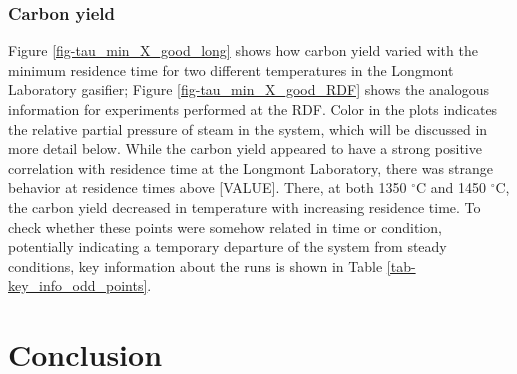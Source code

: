 \documentclass[11pt,twocolumn]{article}
\begin{document}
\subsubsection*{Carbon yield}
Figure \ref{fig-tau_min_X_good_long} shows how carbon yield varied with the minimum residence time for two different temperatures in the Longmont Laboratory gasifier; Figure \ref{fig-tau_min_X_good_RDF} shows the analogous information for experiments performed at the RDF.  Color in the plots indicates the relative partial pressure of steam in the system, which will be discussed in more detail below.  While the carbon yield appeared to have a strong positive correlation with residence time at the Longmont Laboratory, there was strange behavior at residence times above [VALUE].  There, at both 1350 $^{\circ}$C and 1450 $^{\circ}$C, the carbon yield decreased in temperature with increasing residence time.  To check whether these points were somehow related in time or condition, potentially indicating a temporary departure of the system from steady conditions, key information about the runs is shown in Table \ref{tab-key_info_odd_points}.



\section*{Conclusion}



\newpage
\appendix
\onecolumn
\end{document}
